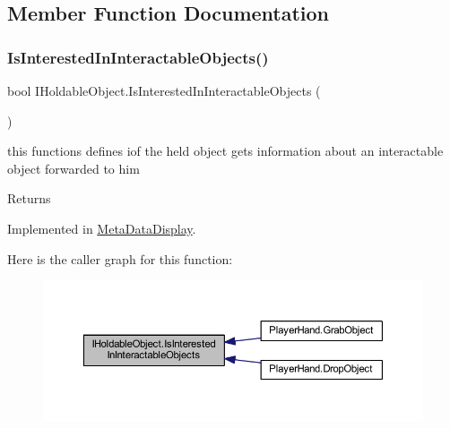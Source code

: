 \subsection{Member Function Documentation}
\mbox{\label{interface_i_holdable_object_a0356d534c17ab4e04fba00b42abeea77}} 
\subsubsection{\texorpdfstring{Is\+Interested\+In\+Interactable\+Objects()}{IsInterestedInInteractableObjects()}}
{\footnotesize\ttfamily bool I\+Holdable\+Object.\+Is\+Interested\+In\+Interactable\+Objects (\begin{DoxyParamCaption}{ }\end{DoxyParamCaption})}



this functions defines iof the held object gets information about an interactable object forwarded to him 

\begin{DoxyReturn}{Returns}

\end{DoxyReturn}


Implemented in \mbox{\hyperlink{class_meta_data_display_a6aa943864ef85667977a13c895c2ce23}{Meta\+Data\+Display}}.

Here is the caller graph for this function\+:
\nopagebreak
\begin{figure}[H]
\begin{center}
\leavevmode
\includegraphics[width=350pt]{interface_i_holdable_object_a0356d534c17ab4e04fba00b42abeea77_icgraph}
\end{center}
\end{figure}
\mbox{\label{interface_i_holdable_object_a19523673c41505d8533aa50b957e95a1}} 
